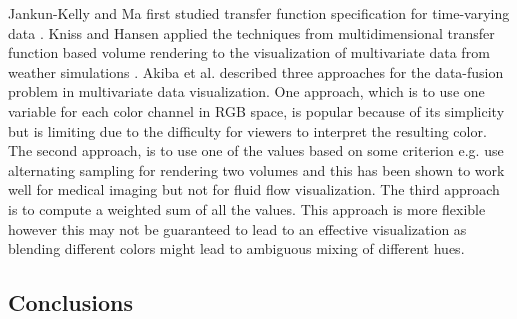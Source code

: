 \documentclass{egpubl}
\begin{document}
Jankun-Kelly and Ma first studied transfer function specification for time-varying data \cite{jankun-kelly_study_2001}.
Kniss and Hansen applied the techniques from multidimensional transfer function based volume rendering to the visualization of multivariate data from weather simulations \cite{kniss_volume_2002}.
Akiba et al. \cite{akiba_visualizing_2007} described three approaches for the data-fusion problem in multivariate data visualization.
One approach, which is to use one variable for each color channel in RGB space, is popular because of its simplicity but is limiting due to the difficulty for viewers to interpret the resulting color.
The second approach, is to use one of the values based on some criterion e.g. \cite{hastreiter_integrated_1998}
use alternating sampling for rendering two volumes and this has been shown to work well for medical imaging but not for fluid flow visualization.
The third approach is to compute a weighted sum of all the values. This approach is more flexible however this may not be guaranteed to lead to an effective visualization as blending different colors might lead to ambiguous mixing of different hues.



\subsection{Conclusions}


	
%

	

	
	
\end{document}

